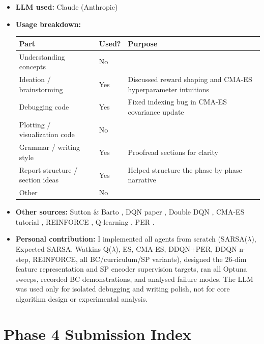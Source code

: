 \documentclass[11pt, oneside]{article}
\begin{document}
\begin{itemize}[noitemsep]
\item \textbf{LLM used:} Claude (Anthropic)
\item \textbf{Usage breakdown:}

\begin{tabular}{l|l|p{5.5cm}}
\toprule
Part & Used? & Purpose \\
\midrule
Understanding concepts & No & \\
Ideation / brainstorming & Yes & Discussed reward shaping and CMA-ES hyperparameter intuitions \\
Debugging code & Yes & Fixed indexing bug in CMA-ES covariance update \\
Plotting / visualization code & No & \\
Grammar / writing style & Yes & Proofread sections for clarity \\
Report structure / section ideas & Yes & Helped structure the phase-by-phase narrative \\
Other & No & \\
\bottomrule
\end{tabular}

\item \textbf{Other sources:} Sutton \& Barto \cite{sutton2018}, DQN paper \cite{mnih2015}, Double DQN \cite{van2016deep}, CMA-ES tutorial \cite{hansen2016cma}, REINFORCE \cite{williams1992}, Q-learning \cite{watkins1992}, PER \cite{schaul2015}.

\item \textbf{Personal contribution:} I implemented all agents from scratch (SARSA($\lambda$), Expected SARSA, Watkins Q($\lambda$), ES, CMA-ES, DDQN+PER, DDQN n-step, REINFORCE, all BC/curriculum/SP variants), designed the 26-dim feature representation and SP encoder supervision targets, ran all Optuna sweeps, recorded BC demonstrations, and analysed failure modes. The LLM was used only for isolated debugging and writing polish, not for core algorithm design or experimental analysis.
\end{itemize}




\appendix

\section{Phase 4 Submission Index}
\end{document}

